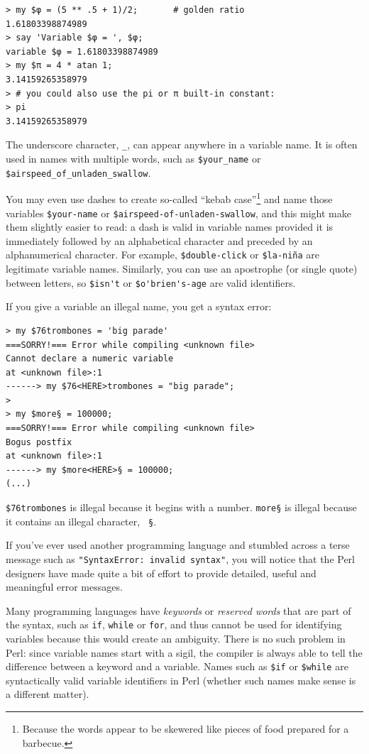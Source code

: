 \begin{verbatim}
> my $φ = (5 ** .5 + 1)/2;       # golden ratio
1.61803398874989
> say 'Variable $φ = ', $φ;
variable $φ = 1.61803398874989
> my $π = 4 * atan 1; 
3.14159265358979
> # you could also use the pi or π built-in constant:
> pi
3.14159265358979
\end{verbatim}

The underscore character, \verb"_", can appear anywhere in a variable name.
It is often used in names with multiple words, such as 
\verb"$your_name" or \verb"$airspeed_of_unladen_swallow". 

You may even use dashes to create so-called 
``kebab case''\footnote{Because the 
words appear to be skewered like pieces of food prepared for 
a barbecue.} and name those variables 
\verb"$your-name" or \verb"$airspeed-of-unladen-swallow", and this 
might make them slightly easier to read: a dash \- is 
valid in variable names provided it is immediately followed by an 
alphabetical character and preceded by an alphanumerical character. 
For example, \verb"$double-click" or \verb"$la-niña" are legitimate 
variable names. Similarly, you can use an apostrophe \' (or single 
quote) between letters, so \verb"$isn't" or \verb"$o'brien's-age" 
are valid identifiers.


If you give a variable an illegal name, you get a syntax error:

\begin{verbatim}
> my $76trombones = 'big parade'
===SORRY!=== Error while compiling <unknown file>
Cannot declare a numeric variable
at <unknown file>:1
------> my $76<HERE>trombones = "big parade";
>
> my $more§ = 100000;
===SORRY!=== Error while compiling <unknown file>
Bogus postfix
at <unknown file>:1
------> my $more<HERE>§ = 100000;
(...)
\end{verbatim}
%
{\tt \$76trombones} is illegal because it begins with a number.
{\tt more§} is illegal because it contains an illegal character, {\tt
§}. 

If you've ever used another programming language and stumbled across a terse message such as {\tt"SyntaxError: invalid syntax"}, you will notice that the Perl designers have made quite a bit of effort to provide detailed, useful and meaningful error messages. 

Many programming languages have \emph{keywords} or \emph{reserved words} that are part of the syntax, such as {\tt if}, {\tt while} or {\tt for}, and thus cannot be used for identifying variables because this would create an ambiguity. There is no such problem in Perl: since variable names start with a sigil, the compiler is always able to tell the difference between a keyword and a variable. Names such as {\tt \$if} or {\tt \$while} are syntactically valid variable identifiers in Perl (whether such names make sense is a different matter).



